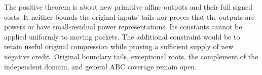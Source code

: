 The positive theorem is about new primitive affine outputs and their
full signed costs. It neither bounds the original inputs' tails nor
proves that the outputs are powers or have small-residual power
representations. Its constants cannot be applied uniformly to moving
packets. The additional constraint would be to retain useful original
compression while proving a sufficient supply of new negative credit.
Original boundary tails, exceptional roots, the complement of the
independent domain, and general ABC coverage remain open.
